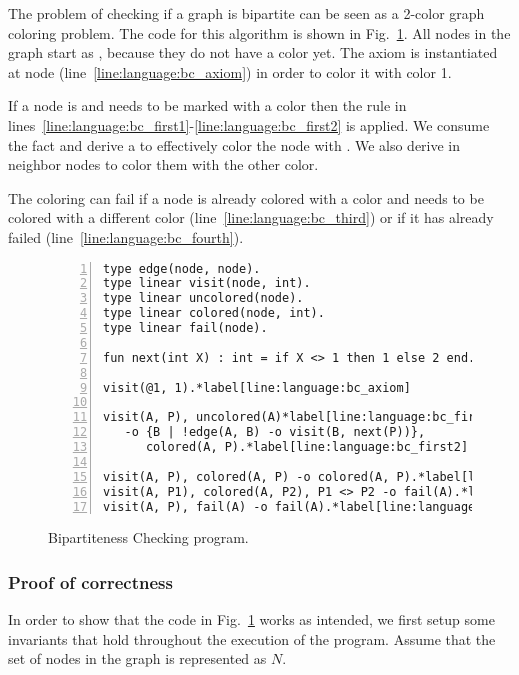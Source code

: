 The problem of checking if a graph is bipartite can be seen as a 2-color graph
coloring problem.  The code for this algorithm is shown in
Fig.~\ref{language:code:bichecking}. All nodes in the graph start as
, because they do not have a color yet. The axiom
 is instantiated at node 
(line~\ref{line:language:bc_axiom}) in order to color it with color 1.

If a node is  and needs to be marked with a color 
then the rule in
lines~\ref{line:language:bc_first1}-\ref{line:language:bc_first2} is applied. We
consume the  fact and derive a  to
effectively color the node with . We also derive  in neighbor nodes to color them with the other color. 

The coloring can fail if a node is already colored with a color  and
needs to be colored with a different color (line~\ref{line:language:bc_third})
or if it has already failed (line~\ref{line:language:bc_fourth}).

\begin{figure}[h!]
\begin{Verbatim}[numbers=left,fontsize=\codesize,commandchars=\*\[\]]
type edge(node, node).
type linear visit(node, int).
type linear uncolored(node).
type linear colored(node, int).
type linear fail(node).

fun next(int X) : int = if X <> 1 then 1 else 2 end.

visit(@1, 1).*label[line:language:bc_axiom]

visit(A, P), uncolored(A)*label[line:language:bc_first1]
   -o {B | !edge(A, B) -o visit(B, next(P))},
      colored(A, P).*label[line:language:bc_first2]

visit(A, P), colored(A, P) -o colored(A, P).*label[line:language:bc_second]
visit(A, P1), colored(A, P2), P1 <> P2 -o fail(A).*label[line:language:bc_third]
visit(A, P), fail(A) -o fail(A).*label[line:language:bc_fourth]
\end{Verbatim}
  \caption{Bipartiteness Checking program.}
  \label{language:code:bichecking}
\end{figure}

\subsubsection{Proof of correctness}

In order to show that the code in Fig.~\ref{language:code:bichecking} works as
intended, we first setup some invariants that hold throughout the execution of
the program. Assume that the set of nodes in the graph is represented as $N$.

